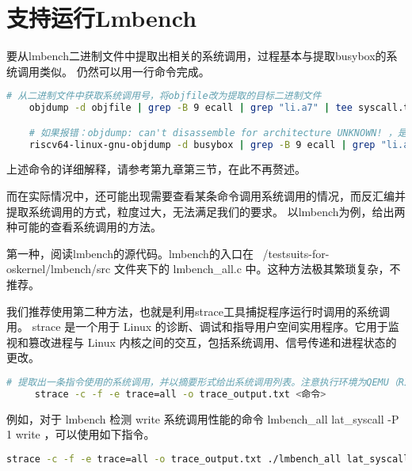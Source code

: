 \section{支持运行Lmbench}
要从lmbench二进制文件中提取出相关的系统调用，过程基本与提取busybox的系统调用类似。
仍然可以用一行命令完成。

\begin{lstlisting}[language=bash]
    # 从二进制文件中获取系统调用号，将objfile改为提取的目标二进制文件
    objdump -d objfile | grep -B 9 ecall | grep "li.a7" | tee syscall.txt

    # 如果报错：objdump: can't disassemble for architecture UNKNOWN! ，是由于当前的objdump并非RISC-V架构，尝试
    riscv64-linux-gnu-objdump -d busybox | grep -B 9 ecall | grep "li.a7" | tee syscall.txt

\end{lstlisting}

上述命令的详细解释，请参考第九章第三节，在此不再赘述。

而在实际情况中，还可能出现需要查看某条命令调用系统调用的情况，而反汇编并提取系统调用的方式，粒度过大，无法满足我们的要求。
以lmbench为例，给出两种可能的查看系统调用的方法。

第一种，阅读lmbench的源代码。lmbench的入口在 ~/testsuits-for-oskernel/lmbench/src 文件夹下的 lmbench_all.c 中。这种方法极其繁琐复杂，不推荐。

我们推荐使用第二种方法，也就是利用strace工具捕捉程序运行时调用的系统调用。
strace 是一个用于 Linux 的诊断、调试和指导用户空间实用程序。它用于监视和篡改进程与 Linux 内核之间的交互，包括系统调用、信号传递和进程状态的更改。


\begin{lstlisting}[language=bash]
    # 提取出一条指令使用的系统调用，并以摘要形式给出系统调用列表。注意执行环境为QEMU（RISCV64+Debian）
     strace -c -f -e trace=all -o trace_output.txt <命令>
\end{lstlisting}

例如，对于 lmbench 检测 write 系统调用性能的命令 lmbench_all lat_syscall -P 1 write ，可以使用如下指令。

\begin{lstlisting}[language=bash]
      strace -c -f -e trace=all -o trace_output.txt ./lmbench_all lat_syscall -P 1 write
\end{lstlisting}

